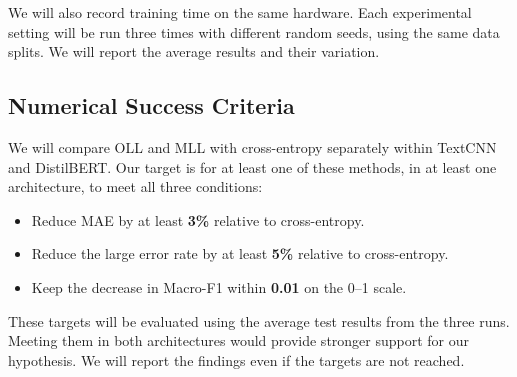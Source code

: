 \documentclass[conference,a4paper,9pt]{IEEEtran}
\begin{document}
We will also record training time on the same hardware. Each experimental setting will be run three times with different random seeds, using the same data splits. We will report the average results and their variation.

\subsection{Numerical Success Criteria}

We will compare OLL and MLL with cross-entropy separately within TextCNN and DistilBERT. Our target is for at least one of these methods, in at least one architecture, to meet all three conditions:

\begin{itemize}
\item Reduce MAE by at least \textbf{3\%} relative to cross-entropy.
\item Reduce the large error rate by at least \textbf{5\%} relative to cross-entropy.
\item Keep the decrease in Macro-F1 within \textbf{0.01} on the 0--1 scale.
\end{itemize}

These targets will be evaluated using the average test results from the three runs. Meeting them in both architectures would provide stronger support for our hypothesis. We will report the findings even if the targets are not reached.
\end{document}
